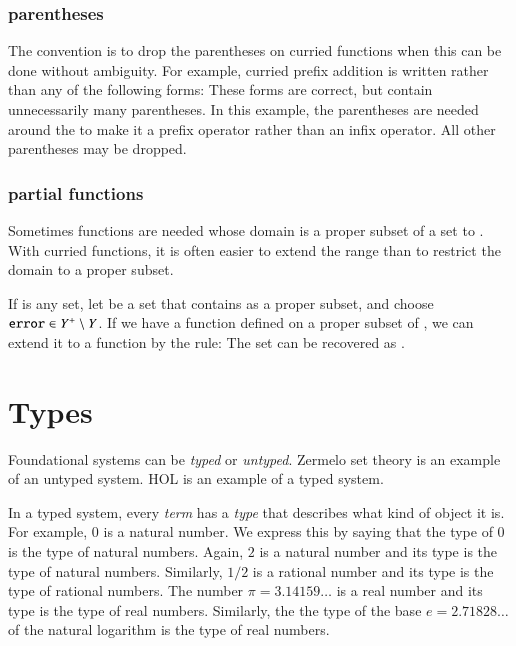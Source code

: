 \subsection{parentheses}

The convention is to drop the parentheses on curried functions when this can be done without ambiguity.  For example, curried prefix addition is written
rather than any of the following forms:
These forms are correct, but contain unnecessarily many parentheses.
In this example, the parentheses are needed around the \mc{$(+)$} to make it
a prefix operator rather than an infix operator. All other parentheses may
be dropped.

\subsection{partial functions}

Sometimes functions are needed whose domain is a proper subset of a set  to .  With curried functions, it is often easier to extend the range than to restrict the domain to a proper subset.

If  is any set, let  be a set that contains  as a proper subset, and choose $\verb!error!\in Y^+\setminus Y$.  
If we have a function  defined on a proper subset  of , we can
extend it to a function  by the rule:
The set  can be recovered as
.







\chapter{Types}

Foundational systems can be {\it typed} or {\it untyped}.  Zermelo set
theory is an example of an untyped system.  HOL is an example of a typed
system.

In a typed system, every  {\it term} has a {\it type} that describes
what kind of object it is.   For example, $0$ is a natural number.  We express this by saying that the type of $0$ is the type of natural numbers.  Again, $2$ is a natural number and its type is the type of natural numbers.  Similarly, $1/2$ is a rational number and its type is the type of rational numbers.  The number $\pi = 3.14159\ldots$ is a real number and its type is the type of real numbers.  Similarly, the the type of the base $e=2.71828\ldots$ of the natural logarithm is the type of real numbers.

